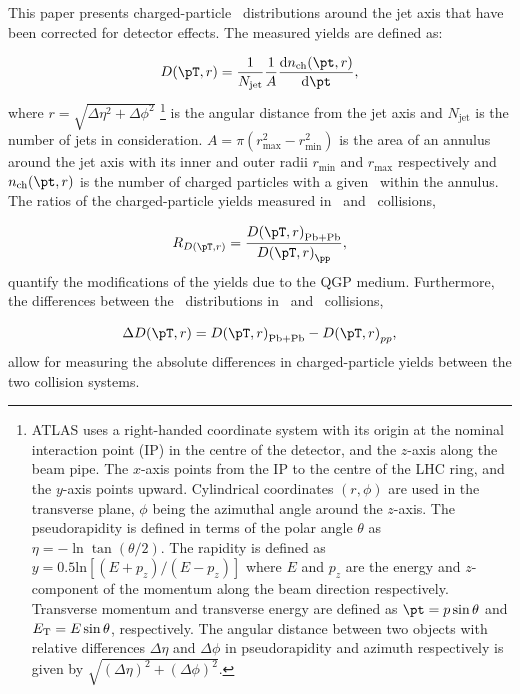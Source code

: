 This paper presents charged-particle \pt\ distributions around the jet axis that have been corrected for detector effects.
The measured yields are defined as:

\begin{align*}
\Dptr = \frac{1}{N_{\mathrm{jet}}} \frac{1}{A} \frac{\mathrm{d} n_{\mathrm{ch}} (\pt, r)}{\mathrm{d} \pt},
\end{align*}
where $r = \sqrt{\Delta \eta^2 + \Delta \phi^2}$ \footnote{ATLAS uses a right-handed coordinate system with its origin at the nominal interaction point (IP) in the centre of the detector, and the $z$-axis along the beam pipe.
The $x$-axis points from the IP to the centre of the LHC ring, and the $y$-axis points upward.
Cylindrical coordinates $(r,\phi)$ are used in the transverse plane, $\phi$ being the azimuthal angle around the $z$-axis.
The pseudorapidity is defined in terms of the polar angle $\theta$ as $\eta=-\ln\tan(\theta/2)$.
The rapidity is defined as $y = 0.5\text{ln}[(E + p_z)/(E-p_z)]$ where $E$ and $p_z$ are the energy and $z$-component of the momentum along the beam direction respectively.
Transverse momentum and transverse energy are defined as $\pt = p \sin\theta$ and $\mbox{$E_{\mathrm{T}}$} = E \sin\theta$, respectively.
The angular distance between two objects with relative differences $\Delta \eta$ and $\Delta \phi$ in pseudorapidity and azimuth respectively is given by $\sqrt{(\Delta \eta )^2 + (\Delta \phi)^2}$.} 
is the angular distance from the jet axis and $N_{\mathrm{jet}}$ is the number of jets in consideration.
$A = \pi (r_{\mathrm{max}}^2 - r_{\mathrm{min}}^2) $ is the area of an annulus around the jet axis with its inner and outer radii $r_{\mathrm{min}}$ and $r_{\mathrm{max}}$ respectively and $n_{\mathrm{ch}}(\pt, r)$ is the number of charged particles with a given \pt\ within the annulus.
The ratios of the charged-particle yields measured in \pbpb\ and \pp\ collisions,

\begin{align*}
   \RDptr = \frac{\Dptr_\mathrm{Pb+Pb}}{\Dptr_{\pp}},
\end{align*}
quantify the modifications of the yields due to the QGP medium.
Furthermore, the differences between the \Dptr\ distributions in \pbpb\ and \pp\ collisions, 

\begin{align*}
   \Delta \Dptr = \Dptr_\mathrm{Pb+Pb} - \Dptr_{pp},
\end{align*}
allow for measuring the absolute differences in charged-particle yields between the two collision systems.



